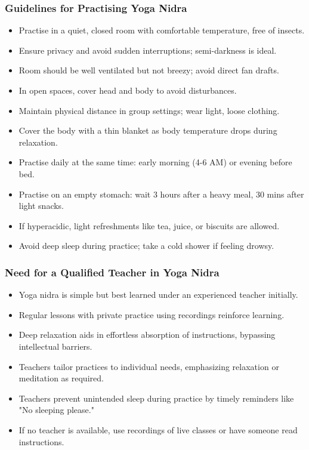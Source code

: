 \begin{frame}[fragile]\frametitle{Guidelines for Practising Yoga Nidra}
\begin{itemize}
    \item Practise in a quiet, closed room with comfortable temperature, free of insects.
    \item Ensure privacy and avoid sudden interruptions; semi-darkness is ideal.
    \item Room should be well ventilated but not breezy; avoid direct fan drafts.
    \item In open spaces, cover head and body to avoid disturbances.
    \item Maintain physical distance in group settings; wear light, loose clothing.
    \item Cover the body with a thin blanket as body temperature drops during relaxation.
    \item Practise daily at the same time: early morning (4-6 AM) or evening before bed.
    \item Practise on an empty stomach: wait 3 hours after a heavy meal, 30 mins after light snacks.
    \item If hyperacidic, light refreshments like tea, juice, or biscuits are allowed.
    \item Avoid deep sleep during practice; take a cold shower if feeling drowsy.
\end{itemize}
\end{frame}

\begin{frame}[fragile]\frametitle{Need for a Qualified Teacher in Yoga Nidra}
\begin{itemize}
    \item Yoga nidra is simple but best learned under an experienced teacher initially.
    \item Regular lessons with private practice using recordings reinforce learning.
    \item Deep relaxation aids in effortless absorption of instructions, bypassing intellectual barriers.
    \item Teachers tailor practices to individual needs, emphasizing relaxation or meditation as required.
    \item Teachers prevent unintended sleep during practice by timely reminders like "No sleeping please."
    \item If no teacher is available, use recordings of live classes or have someone read instructions.
\end{itemize}
\end{frame}

